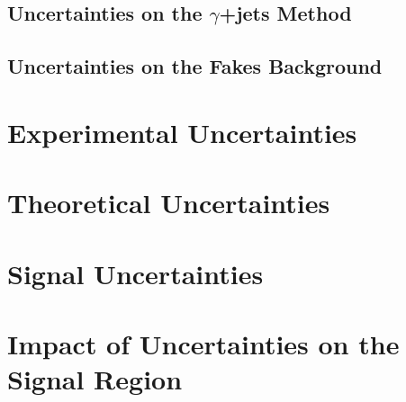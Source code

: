 
\subsection{Uncertainties on the $\gamma$+jets Method}


\subsection{Uncertainties on the Fakes Background}


\section{Experimental Uncertainties}


\section{Theoretical Uncertainties}


\section{Signal Uncertainties}


\section{Impact of Uncertainties on the Signal Region}

